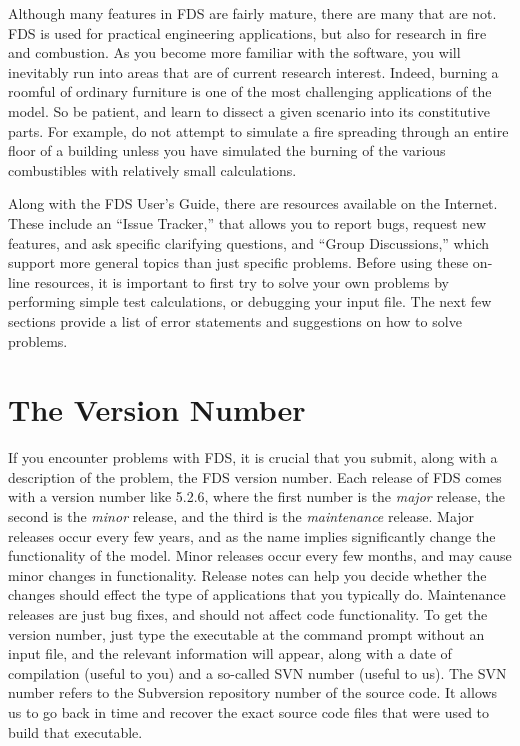 \documentclass[11pt]{book}
\begin{document}
Although many features in FDS are fairly mature, there are many that are not. FDS is used for
practical engineering applications, but also for research in fire and combustion. As you become
more familiar with the software, you will inevitably run into areas that are of current research
interest. Indeed, burning a roomful of ordinary furniture is one of the most challenging applications
of the model. So be patient, and learn to dissect a given scenario into its constitutive parts.
For example, do not attempt to simulate a fire spreading through an entire floor of a
building unless you have simulated the burning of the various combustibles with relatively small calculations.

Along with the FDS User's Guide, there are resources available on the Internet.
These include an ``Issue Tracker,'' that allows you to report bugs, request new features, and ask specific clarifying questions,
and ``Group Discussions,'' which support more general topics than just specific problems.
Before using these on-line resources, it is important to first try to solve your own
problems by performing simple test calculations, or debugging your input file. The next few sections
provide a list of error statements and suggestions on how to solve problems.

\section{The Version Number}

If you encounter problems with FDS, it is crucial that you submit, along with a description of the problem, the FDS version number. Each release of
FDS comes with a version number like 5.2.6, where the first number is the {\em major} release, the second is the {\em minor} release, and the
third is the {\em maintenance} release. Major releases occur every few years, and as the name implies significantly change the functionality of the model.
Minor releases occur every few months, and may cause minor changes in functionality. Release notes can help you decide whether the changes should effect the
type of applications that you typically do. Maintenance releases are just bug fixes, and should not affect code functionality. To get the version number, just
type the executable at the command prompt without an input file, and the relevant information will appear,
along with a date of compilation (useful to you) and a so-called SVN number (useful to us).  The SVN number refers to
the Subversion repository number of the source code. It allows us to go back in time and recover the exact source code files
that were used to build that executable.
\end{document}
